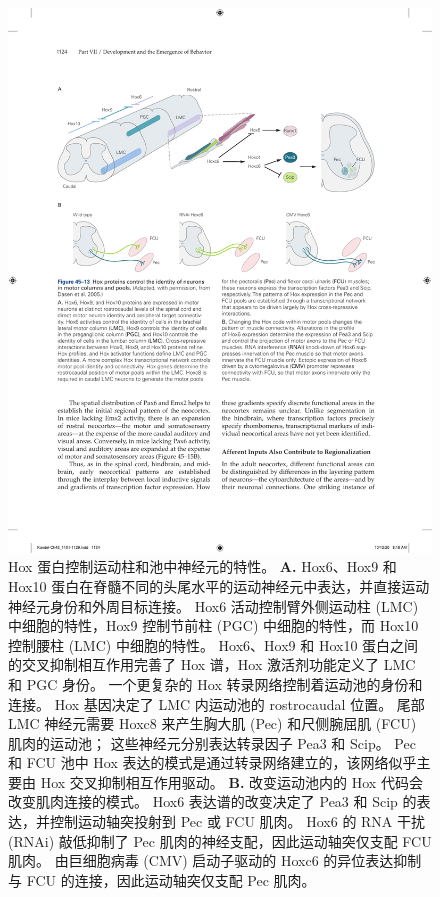 \begin{figure}[htbp]
	\centering
	\includegraphics[width=0.95\linewidth]{chap45/fig_45_13}
	\caption{Hox 蛋白控制运动柱和池中神经元的特性\cite{dasen2005hox}。
		\textbf{A.} Hox6、Hox9 和 Hox10 蛋白在脊髓不同的头尾水平的运动神经元中表达，并直接运动神经元身份和外周目标连接。
		Hox6 活动控制臂外侧运动柱 (LMC) 中细胞的特性，Hox9 控制节前柱 (PGC) 中细胞的特性，而 Hox10 控制腰柱 (LMC) 中细胞的特性。
		Hox6、Hox9 和 Hox10 蛋白之间的交叉抑制相互作用完善了 Hox 谱，Hox 激活剂功能定义了 LMC 和 PGC 身份。
		一个更复杂的 Hox 转录网络控制着运动池的身份和连接。
		Hox 基因决定了 LMC 内运动池的 rostrocaudal 位置。
		尾部 LMC 神经元需要 Hoxc8 来产生胸大肌 (Pec) 和尺侧腕屈肌 (FCU) 肌肉的运动池；
		这些神经元分别表达转录因子 Pea3 和 Scip。
		Pec 和 FCU 池中 Hox 表达的模式是通过转录网络建立的，该网络似乎主要由 Hox 交叉抑制相互作用驱动。
		\textbf{B.} 改变运动池内的 Hox 代码会改变肌肉连接的模式。
		Hox6 表达谱的改变决定了 Pea3 和 Scip 的表达，并控制运动轴突投射到 Pec 或 FCU 肌肉。
		Hox6 的 RNA 干扰 (RNAi) 敲低抑制了 Pec 肌肉的神经支配，因此运动轴突仅支配 FCU 肌肉。
		由巨细胞病毒 (CMV) 启动子驱动的 Hoxc6 的异位表达抑制与 FCU 的连接，因此运动轴突仅支配 Pec 肌肉。}
	\label{fig:45_13}
\end{figure}



